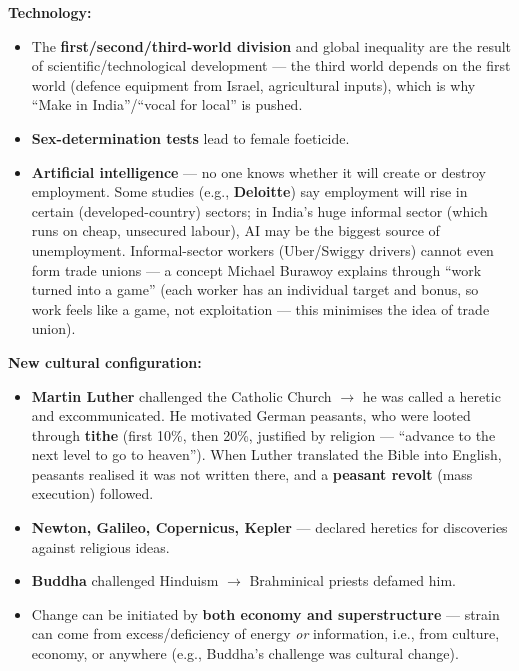 \begin{ExampleBox}
\textbf{Technology:}
\begin{itemize}
\item The \textbf{first/second/third-world division} and global inequality are the result of scientific/technological development --- the third world depends on the first world (defence equipment from Israel, agricultural inputs), which is why ``Make in India''/``vocal for local'' is pushed.
\item \textbf{Sex-determination tests} lead to female foeticide.
\item \textbf{Artificial intelligence} --- no one knows whether it will create or destroy employment. Some studies (e.g., \textbf{Deloitte}) say employment will rise in certain (developed-country) sectors; in India's huge informal sector (which runs on cheap, unsecured labour), AI may be the biggest source of unemployment. Informal-sector workers (Uber/Swiggy drivers) cannot even form trade unions --- a concept Michael Burawoy explains through ``work turned into a game'' (each worker has an individual target and bonus, so work feels like a game, not exploitation --- this minimises the idea of trade union).
\end{itemize}
\end{ExampleBox}

\begin{ExampleBox}
\textbf{New cultural configuration:}
\begin{itemize}
\item \textbf{Martin Luther} challenged the Catholic Church $\rightarrow$ he was called a heretic and excommunicated. He motivated German peasants, who were looted through \textbf{tithe} (first 10\%, then 20\%, justified by religion --- ``advance to the next level to go to heaven''). When Luther translated the Bible into English, peasants realised it was not written there, and a \textbf{peasant revolt} (mass execution) followed.
\item \textbf{Newton, Galileo, Copernicus, Kepler} --- declared heretics for discoveries against religious ideas.
\item \textbf{Buddha} challenged Hinduism $\rightarrow$ Brahminical priests defamed him.
\end{itemize}
\end{ExampleBox}

\begin{CriticalPoint}
\begin{itemize}
\item Change can be initiated by \textbf{both economy and superstructure} --- strain can come from excess/deficiency of energy \textit{or} information, i.e., from culture, economy, or anywhere (e.g., Buddha's challenge was cultural change).
\end{itemize}
\end{CriticalPoint}

